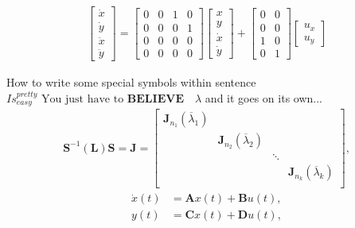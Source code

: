 \documentclass{article}
\begin{document}
\begin{align*} %
\left[\begin{array}{c} \dot{x}\\ \dot{y}\\ \ddot{x}\\ \ddot{y} \end{array}\right]=
\left[\begin{array}{cccc} 0 & 0 & 1 & 0\\ 0 & 0 & 0 & 1\\ 0 & 0 & 0 & 0\\ 0 & 0 & 0 & 0 \end{array}\right]
\left[\begin{array}{c} x\\ y\\ \dot{x}\\ \dot{y} \end{array}\right] + 
\left[\begin{array}{cc} 0 & 0\\ 0 & 0\\ 1 & 0\\ 0 & 1 \end{array}\right]
\left[\begin{array}{c} u_x \\ u_y \end{array}\right]
\end{align*}


\par How to write some special symbols within sentence $ {Is}_{easy}^{pretty} \text{ You just have to } \mathbf{BELIEVE} \quad \lambda $ and it goes on its own...
\begin{align*}
\mathbf{S}^{-1}(\mathbf{L})\mathbf{S}=\mathbf{J}=
\left[ 
\begin{array}{cccc}
\mathbf{J}_{n_1}(\overline{\lambda}_1)& &&  \\
 & \mathbf{J}_{n_2}(\overline{\lambda}_2) & & \\
& & \ddots & \\ 
&&&\mathbf{J}_{n_k}(\overline{\lambda}_k) \\
\end{array}\right],
\end{align*}
\begin{align}\label{stav} %
     \dot{x}(t)&= \textbf{A}x(t) + \textbf{B}u(t),\\
     y(t)&= \textbf{C}x(t) + \textbf{D}u(t), \nonumber
\end{align}
\end{document}
